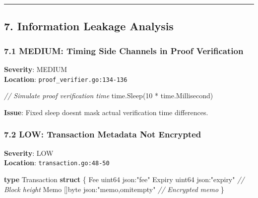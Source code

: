 \documentclass[
]{article}
\newenvironment{Shaded}{}{}
\newcommand{\CommentTok}[1]{\textcolor[rgb]{0.38,0.63,0.69}{\textit{#1}}}
\newcommand{\DataTypeTok}[1]{\textcolor[rgb]{0.56,0.13,0.00}{#1}}
\newcommand{\DecValTok}[1]{\textcolor[rgb]{0.25,0.63,0.44}{#1}}
\newcommand{\KeywordTok}[1]{\textcolor[rgb]{0.00,0.44,0.13}{\textbf{#1}}}
\newcommand{\NormalTok}[1]{#1}
\newcommand{\OperatorTok}[1]{\textcolor[rgb]{0.40,0.40,0.40}{#1}}
\newcommand{\StringTok}[1]{\textcolor[rgb]{0.25,0.44,0.63}{#1}}
\begin{document}
\begin{center}\rule{0.5\linewidth}{0.5pt}\end{center}

\subsection{7. Information Leakage
Analysis}\label{7-information-leakage-analysis}

\subsubsection{7.1 MEDIUM: Timing Side Channels in Proof
Verification}\label{71-medium-timing-side-channels-in-proof-verification}

\textbf{Severity}: MEDIUM\\
\textbf{Location}: \texttt{proof\_verifier.go:134-136}

\begin{Shaded}
\begin{Highlighting}[]
\CommentTok{// Simulate proof verification time}
\NormalTok{time}\OperatorTok{.}\NormalTok{Sleep}\OperatorTok{(}\DecValTok{10} \OperatorTok{*}\NormalTok{ time}\OperatorTok{.}\NormalTok{Millisecond}\OperatorTok{)}
\end{Highlighting}
\end{Shaded}

\textbf{Issue}: Fixed sleep doesn\textquotesingle t mask actual
verification time differences.

\subsubsection{7.2 LOW: Transaction Metadata Not
Encrypted}\label{72-low-transaction-metadata-not-encrypted}

\textbf{Severity}: LOW\\
\textbf{Location}: \texttt{transaction.go:48-50}

\begin{Shaded}
\begin{Highlighting}[]
\KeywordTok{type}\NormalTok{ Transaction }\KeywordTok{struct} \OperatorTok{\{}
\NormalTok{    Fee        }\DataTypeTok{uint64}          \StringTok{\textasciigrave{}json:"fee"\textasciigrave{}}
\NormalTok{    Expiry     }\DataTypeTok{uint64}          \StringTok{\textasciigrave{}json:"expiry"\textasciigrave{}}          \CommentTok{// Block height}
\NormalTok{    Memo       }\OperatorTok{[]}\DataTypeTok{byte}          \StringTok{\textasciigrave{}json:"memo,omitempty"\textasciigrave{}}  \CommentTok{// Encrypted memo}
\OperatorTok{\}}
\end{Highlighting}
\end{Shaded}
\end{document}
